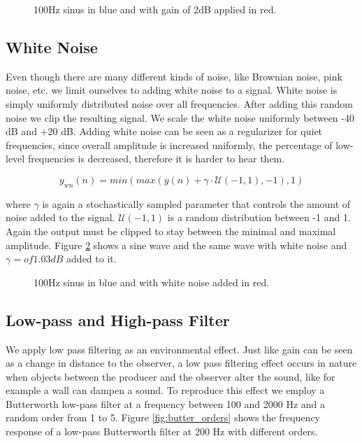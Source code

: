 \begin{figure}[H]
    \centering
    
    \caption[Gain]{100Hz sinus in blue and with gain of 2dB applied in red.}
    \label{fig:gain}
\end{figure}

\subsection{White Noise}

Even though there are many different kinds of noise, like Brownian noise, pink noise, etc. we limit ourselves to adding white noise to a signal. White noise is simply uniformly distributed noise over all frequencies. After adding this random noise we clip the resulting signal. We scale the white noise uniformly between -40 dB and +20 dB. Adding white noise can be seen as a regularizer for quiet frequencies, since overall amplitude is increased uniformly, the percentage of low-level frequencies is decreased, therefore it is harder to hear them.

\begin{equation}\label{eq:whitenoise}
    y_{wn}(n) = min(max(y(n) + \gamma \cdot \mathcal{U}(-1, 1), -1), 1)
\end{equation}

where $\gamma$ is again a stochastically sampled parameter that controls the amount of noise added to the signal. $\mathcal{U}(-1, 1)$ is a random distribution between -1 and 1. Again the output must be clipped to stay between the minimal and maximal amplitude.
Figure \ref{fig:whitenoise} shows a sine wave and the same wave with white noise and $\gamma = of 1.03dB$ added to it.

\begin{figure}[H]
    \centering
    
    \caption[Whitenoise]{100Hz sinus in blue and with white noise added in red.}
    \label{fig:whitenoise}
\end{figure}

\subsection{Low-pass and High-pass Filter}

We apply low pass filtering as an environmental effect. Just like gain can be seen as a change in distance to the observer, a low pass filtering effect occurs in nature when objects between the producer and the observer alter the sound, like for example a wall can dampen a sound. To reproduce this effect we employ a Butterworth low-pass filter at a frequency between 100 and 2000 Hz and a random order from 1 to 5. Figure \ref{fig:butter_orders} shows the frequency response of a low-pass Butterworth filter at 200 Hz with different orders.

